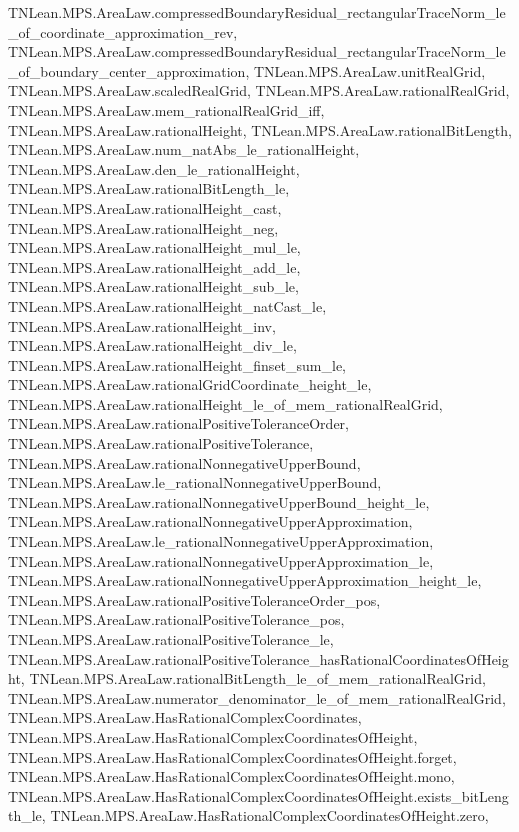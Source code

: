 \begin{lemma}
{        TNLean.MPS.AreaLaw.compressedBoundaryResidual_rectangularTraceNorm_le_of_coordinate_approximation_rev,
        TNLean.MPS.AreaLaw.compressedBoundaryResidual_rectangularTraceNorm_le_of_boundary_center_approximation,
        TNLean.MPS.AreaLaw.unitRealGrid,
        TNLean.MPS.AreaLaw.scaledRealGrid,
        TNLean.MPS.AreaLaw.rationalRealGrid,
        TNLean.MPS.AreaLaw.mem_rationalRealGrid_iff,
        TNLean.MPS.AreaLaw.rationalHeight,
        TNLean.MPS.AreaLaw.rationalBitLength,
        TNLean.MPS.AreaLaw.num_natAbs_le_rationalHeight,
        TNLean.MPS.AreaLaw.den_le_rationalHeight,
        TNLean.MPS.AreaLaw.rationalBitLength_le,
        TNLean.MPS.AreaLaw.rationalHeight_cast,
        TNLean.MPS.AreaLaw.rationalHeight_neg,
        TNLean.MPS.AreaLaw.rationalHeight_mul_le,
        TNLean.MPS.AreaLaw.rationalHeight_add_le,
        TNLean.MPS.AreaLaw.rationalHeight_sub_le,
        TNLean.MPS.AreaLaw.rationalHeight_natCast_le,
        TNLean.MPS.AreaLaw.rationalHeight_inv,
        TNLean.MPS.AreaLaw.rationalHeight_div_le,
        TNLean.MPS.AreaLaw.rationalHeight_finset_sum_le,
        TNLean.MPS.AreaLaw.rationalGridCoordinate_height_le,
        TNLean.MPS.AreaLaw.rationalHeight_le_of_mem_rationalRealGrid,
        TNLean.MPS.AreaLaw.rationalPositiveToleranceOrder,
        TNLean.MPS.AreaLaw.rationalPositiveTolerance,
        TNLean.MPS.AreaLaw.rationalNonnegativeUpperBound,
        TNLean.MPS.AreaLaw.le_rationalNonnegativeUpperBound,
        TNLean.MPS.AreaLaw.rationalNonnegativeUpperBound_height_le,
        TNLean.MPS.AreaLaw.rationalNonnegativeUpperApproximation,
        TNLean.MPS.AreaLaw.le_rationalNonnegativeUpperApproximation,
        TNLean.MPS.AreaLaw.rationalNonnegativeUpperApproximation_le,
        TNLean.MPS.AreaLaw.rationalNonnegativeUpperApproximation_height_le,
        TNLean.MPS.AreaLaw.rationalPositiveToleranceOrder_pos,
        TNLean.MPS.AreaLaw.rationalPositiveTolerance_pos,
        TNLean.MPS.AreaLaw.rationalPositiveTolerance_le,
        TNLean.MPS.AreaLaw.rationalPositiveTolerance_hasRationalCoordinatesOfHeight,
        TNLean.MPS.AreaLaw.rationalBitLength_le_of_mem_rationalRealGrid,
        TNLean.MPS.AreaLaw.numerator_denominator_le_of_mem_rationalRealGrid,
        TNLean.MPS.AreaLaw.HasRationalComplexCoordinates,
        TNLean.MPS.AreaLaw.HasRationalComplexCoordinatesOfHeight,
        TNLean.MPS.AreaLaw.HasRationalComplexCoordinatesOfHeight.forget,
        TNLean.MPS.AreaLaw.HasRationalComplexCoordinatesOfHeight.mono,
        TNLean.MPS.AreaLaw.HasRationalComplexCoordinatesOfHeight.exists_bitLength_le,
        TNLean.MPS.AreaLaw.HasRationalComplexCoordinatesOfHeight.zero,
}
\end{lemma}
